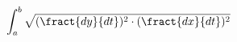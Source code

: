 \documentclass[preview]{standalone}
\begin{document}
\begin{align*}
\int_{a}^{b} \sqrt{(\fract{dy}{dt})^2 \cdot (\fract{dx}{dt})^2}
\end{align*}
\end{document}

